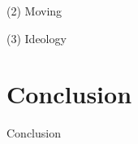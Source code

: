 \documentclass[12pt,a4paper]{article}
\begin{document}
(2) Moving

(3) Ideology






\section{Conclusion}
Conclusion



\end{document}
